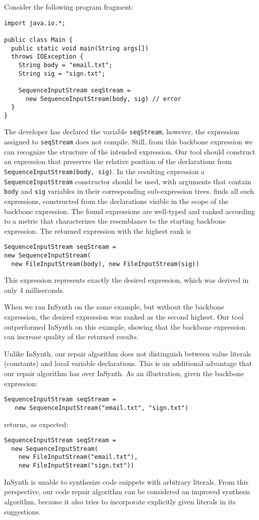 Consider the following program fragment:
\begin{lstlisting}
import java.io.*;

public class Main {
  public static void main(String args[]) 
  throws IOException {
    String body = "email.txt";
    String sig = "sign.txt";
    
    SequenceInputStream seqStream = 
      new SequenceInputStream(body, sig) // error
  }
} 
\end{lstlisting}
The developer has declared the variable \lstinline{seqStream}, however, the expression assigned to \lstinline{seqStream} does not compile. Still, from this backbone expression we can recognize the structure of the intended expression. Our tool should construct an expression that preserves the relative position of the declarations from \lstinline{SequenceInputStream(body, sig)}. In the resulting expression a \lstinline{SequenceInputStream} constructor should be used, with arguments that contain \lstinline{body} and \lstinline{sig} variables in their corresponding sub-expression trees. \ourTool finds all such expressions, 
constructed from the declarations visible in the scope of the backbone expression. The found expressions are well-typed and ranked according to a metric that characterizes the resemblance to the starting backbone expression.
The returned expression with the highest rank is
\begin{lstlisting}
SequenceInputStream seqStream = 
new SequenceInputStream(
  new FileInputStream(body), new FileInputStream(sig))
\end{lstlisting}
This expression represents exactly the desired expression, which was derived in only 4 milliseconds.
 
When we ran InSynth on the same example, but without the backbone expression, the desired expression was ranked as the second highest. Our tool outperformed InSynth on this example, showing that the backbone expression can increase quality of the returned results.

Unlike InSynth, our repair algorithm does not distinguish between value literals (constants) and local variable declarations. This is an additional advantage that our repair algorithm has over InSynth. As an illustration, given the backbone expression:
\begin{lstlisting}
SequenceInputStream seqStream = 
   new SequenceInputStream("email.txt", "sign.txt") 
\end{lstlisting}
\ourTool returns, as expected:
\begin{lstlisting}
SequenceInputStream seqStream = 
  new SequenceInputStream(
    new FileInputStream("email.txt"), 
    new FileInputStream("sign.txt"))
\end{lstlisting}
InSynth is unable to synthesize code snippets with arbitrary literals. From this perspective, our code repair algorithm can be considered an improved synthesis algorithm, because it also tries to incorporate explicitly given literals in its suggestions.

